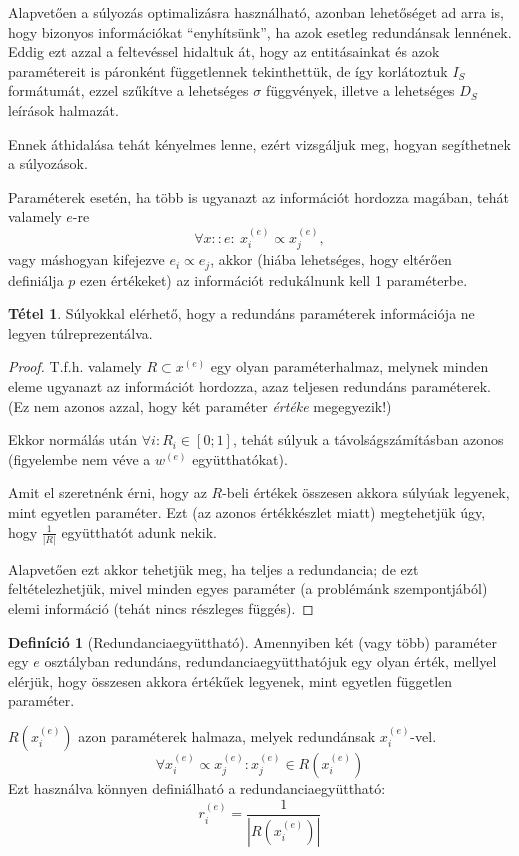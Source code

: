 \documentclass[twocolumn]{article}
\theoremstyle{definition}
\newtheorem{definition}{Definíció}[section]
\newtheorem{theorem}{Tétel}[section]
\newcommand{\ent}[2]{ {#1}^{(#2)} }
\begin{document}
    Alapvetően a súlyozás optimalizásra használható, azonban lehetőséget ad arra is, hogy bizonyos információkat \enquote{enyhítsünk}, ha azok esetleg redundánsak lennének. Eddig ezt azzal a feltevéssel hidaltuk át, hogy az entitásainkat és azok paramétereit is páronként függetlennek tekinthettük, de így korlátoztuk $I_S$ formátumát, ezzel szűkítve a lehetséges $\sigma$ függvények, illetve a lehetséges $D_S$ leírások halmazát.
    
    Ennek áthidalása tehát kényelmes lenne, ezért vizsgáljuk meg, hogyan segíthetnek a súlyozások.

    Paraméterek esetén, ha több is ugyanazt az információt hordozza magában, tehát valamely $e$-re $$\forall x::e : \ \ent x e _i \propto \ent x e _j,$$ vagy máshogyan kifejezve $e_i \propto e_j$, akkor (hiába lehetséges, hogy eltérően definiálja $p$ ezen értékeket) az információt redukálnunk kell 1 paraméterbe.

    \begin{theorem}
        Súlyokkal elérhető, hogy a redundáns paraméterek információja ne legyen túlreprezentálva.
        
        \begin{proof}
            T.f.h. valamely $R \subset \ent x e$ egy olyan paraméterhalmaz, melynek minden eleme ugyanazt az információt hordozza, azaz teljesen redundáns paraméterek. (Ez nem azonos azzal, hogy két paraméter \textit{értéke} megegyezik!)
            
            Ekkor normálás után $\forall i: R_i \in [0;1]$, tehát súlyuk a távolságszámításban azonos (figyelembe nem véve a $\ent w e$ együtthatókat). 
            
            Amit el szeretnénk érni, hogy az $R$-beli értékek összesen akkora súlyúak legyenek, mint egyetlen paraméter. Ezt (az azonos értékkészlet miatt) megtehetjük úgy, hogy $\frac{1}{|R|}$ együtthatót adunk nekik.
            
            Alapvetően ezt akkor tehetjük meg, ha teljes a redundancia; de ezt feltételezhetjük, mivel minden egyes paraméter (a problémánk szempontjából) elemi információ (tehát nincs részleges függés).
        \end{proof}
    \end{theorem}
    
    \begin{definition}[Redundanciaegyüttható]
        Amennyiben két (vagy több) paraméter egy $e$ osztályban redundáns, redundanciaegyütthatójuk egy olyan érték, mellyel elérjük, hogy összesen akkora értékűek legyenek, mint egyetlen független paraméter.
        
        $R(\ent x e _i)$ azon paraméterek halmaza, melyek redundánsak $\ent x e _i$-vel.
        \begin{equation}
            \forall \ent x e _i \propto \ent x e _j : \ent x e _j \in R(\ent x e _i) 
        \end{equation}
        Ezt használva könnyen definiálható a redundanciaegyüttható:
        \begin{equation}
            \ent r e _i = \frac{1}{|R(\ent x e _i)|}
        \end{equation}
    \end{definition}
    
\end{document}
